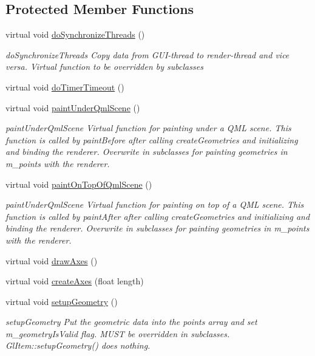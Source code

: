 \subsection*{Protected Member Functions}
\begin{DoxyCompactItemize}
\item 
virtual void \mbox{\hyperlink{class_g_l_item_aaec2f87eed24614ebed2268b10b3c342}{do\+Synchronize\+Threads}} ()
\begin{DoxyCompactList}\small\item\em do\+Synchronize\+Threads Copy data from G\+U\+I-\/thread to render-\/thread and vice versa. Virtual function to be overridden by subclasses \end{DoxyCompactList}\item 
virtual void \mbox{\hyperlink{class_g_l_item_a5ae087d6d77f470952829beee4346af8}{do\+Timer\+Timeout}} ()
\item 
virtual void \mbox{\hyperlink{class_g_l_item_a6e779fa84599e999b6e299d5aac92fa2}{paint\+Under\+Qml\+Scene}} ()
\begin{DoxyCompactList}\small\item\em paint\+Under\+Qml\+Scene Virtual function for painting under a Q\+ML scene. This function is called by paint\+Before after calling create\+Geometries and initializing and binding the renderer. Overwrite in subclasses for painting geometries in m\+\_\+points with the renderer. \end{DoxyCompactList}\item 
virtual void \mbox{\hyperlink{class_g_l_item_a595830cf6ae5434a253c68366275b65d}{paint\+On\+Top\+Of\+Qml\+Scene}} ()
\begin{DoxyCompactList}\small\item\em paint\+Under\+Qml\+Scene Virtual function for painting on top of a Q\+ML scene. This function is called by paint\+After after calling create\+Geometries and initializing and binding the renderer. Overwrite in subclasses for painting geometries in m\+\_\+points with the renderer. \end{DoxyCompactList}\item 
virtual void \mbox{\hyperlink{class_g_l_item_aef70de1482fa71495a178626566f4f3a}{draw\+Axes}} ()
\item 
virtual void \mbox{\hyperlink{class_g_l_item_acbf456bdbaf38bc941029bddab6a69a9}{create\+Axes}} (float length)
\item 
virtual void \mbox{\hyperlink{class_g_l_item_a74269f515d4d025149cc8a603d8c66f1}{setup\+Geometry}} ()
\begin{DoxyCompactList}\small\item\em setup\+Geometry Put the geometric data into the points array and set m\+\_\+geometry\+Is\+Valid flag. M\+U\+ST be overridden in subclasses. Gl\+Item\+::setup\+Geometry() does nothing. \end{DoxyCompactList}\item 

\end{DoxyCompactItemize}
